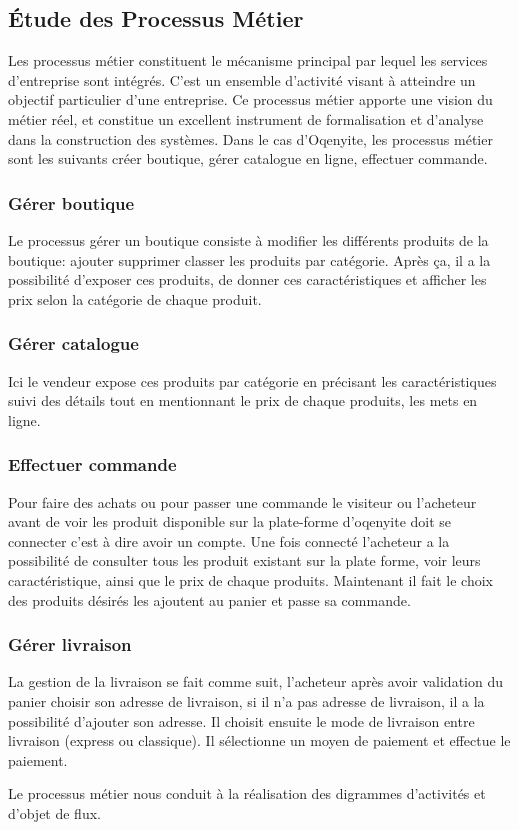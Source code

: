 \subsection{Étude des Processus Métier}
Les processus métier constituent le mécanisme principal par lequel les services d'entreprise sont intégrés. C'est un ensemble d'activité visant à atteindre un objectif particulier d'une entreprise. Ce processus métier apporte une vision du métier réel, et constitue un excellent instrument de formalisation et d'analyse dans la construction des systèmes.
Dans le cas d'Oqenyite, les processus métier sont les suivants créer boutique, gérer catalogue en ligne, effectuer commande.
 

\subsubsection* {Gérer boutique}
Le processus gérer un boutique consiste à  
modifier les différents produits de la boutique: ajouter supprimer classer les produits par catégorie.  Après ça, il a la possibilité d’exposer ces produits, de donner ces caractéristiques et afficher les prix selon la catégorie de chaque produit. 

\subsubsection*{Gérer catalogue}

Ici le vendeur expose ces produits par catégorie en précisant les caractéristiques suivi des détails tout en mentionnant le prix de chaque produits, les mets en ligne.


\subsubsection*{Effectuer commande}

Pour faire des achats ou pour passer une commande le visiteur ou l'acheteur avant de voir les produit disponible sur la plate-forme d'oqenyite doit se connecter c'est à dire avoir un compte. Une fois connecté l'acheteur a la possibilité de consulter tous les produit existant sur la plate forme, voir leurs caractéristique, ainsi que le prix de chaque produits. Maintenant il fait le choix des produits désirés les ajoutent au panier et passe sa commande.



\subsubsection*{Gérer livraison}

La gestion de la livraison se fait comme suit, l'acheteur après avoir validation du panier choisir son adresse de livraison, si il n'a pas adresse de livraison, il a la possibilité d'ajouter son adresse. Il choisit ensuite le mode de livraison entre livraison (express ou classique). Il sélectionne un moyen de paiement et effectue le paiement.

Le processus métier nous conduit à la réalisation des digrammes d'activités et d'objet de flux.

